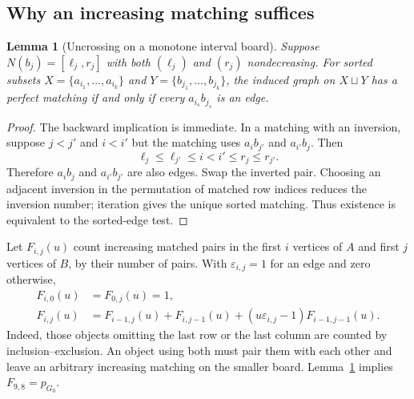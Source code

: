 \documentclass[11pt]{article}
\numberwithin{equation}{section}
\newtheorem{lemma}[theorem]{Lemma}
\theoremstyle{definition}
\begin{document}
\subsection{Why an increasing matching suffices}

\begin{lemma}[Uncrossing on a monotone interval board]\label{htwo:lem:uncross}
Suppose $N(b_j)=[\ell_j,r_j]$ with both $(\ell_j)$ and $(r_j)$ nondecreasing.
For sorted subsets $X=\{a_{i_1},\ldots,a_{i_k}\}$ and
$Y=\{b_{j_1},\ldots,b_{j_k}\}$, the induced graph on $X\sqcup Y$ has a
perfect matching if and only if every $a_{i_s}b_{j_s}$ is an edge.
\end{lemma}
\begin{proof}
The backward implication is immediate. In a matching with an inversion,
suppose $j<j'$ and $i<i'$ but the matching uses $a_i b_{j'}$ and
$a_{i'}b_j$. Then
\[
 \ell_j\le\ell_{j'}\le i<i'\le r_j\le r_{j'}.
\]
Therefore $a_i b_j$ and $a_{i'}b_{j'}$ are also edges. Swap the inverted
pair. Choosing an adjacent inversion in the permutation of matched row
indices reduces the inversion number; iteration gives the unique sorted
matching. Thus existence is equivalent to the sorted-edge test.
\end{proof}

Let $F_{i,j}(u)$ count increasing matched pairs in the first $i$ vertices
of $A$ and first $j$ vertices of $B$, by their number of pairs. With
$\varepsilon_{i,j}=1$ for an edge and zero otherwise,
\begin{equation}
\begin{split}
 F_{i,0}(u)&=F_{0,j}(u)=1,\\
 F_{i,j}(u)&=F_{i-1,j}(u)+F_{i,j-1}(u)
       +(u\varepsilon_{i,j}-1)F_{i-1,j-1}(u).
\end{split}\label{htwo:eq:DP}
\end{equation}
Indeed, those objects omitting the last row or the last column are counted
by inclusion--exclusion. An object using both must pair them with each
other and leave an arbitrary increasing matching on the smaller board.
Lemma~\ref{htwo:lem:uncross} implies $F_{9,8}=p_{G_0}$.
\end{document}
